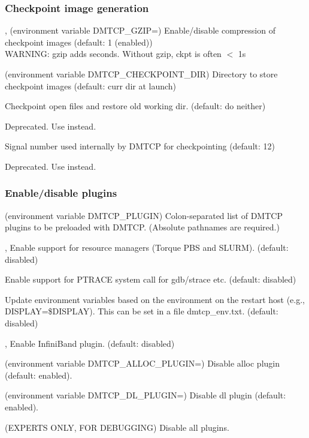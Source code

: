 \subsubsection{Checkpoint image generation}
\begin{Description}
  \item[\Opt{--gzip}, \Opt{--no-gzip} (environment variable DMTCP_GZIP=\Lbr01\Rbr)]
    Enable/disable compression of checkpoint images (default: 1 (enabled))\\
    WARNING:  gzip adds seconds.  Without gzip, ckpt is often $<$ 1s
  \item[\OptSArg{--ckptdir}{path} (environment variable DMTCP_CHECKPOINT_DIR)]
    Directory to store checkpoint images (default: curr dir at launch)
  \item[\Opt{--ckpt-open-files}]
    Checkpoint open files and restore old working dir. (default: do neither)
  \item[\Opt{--checkpoint-open-files}]
    Deprecated. Use  instead.
  \item[\OptSArg{--ckpt-signal}{signum}]
      Signal number used internally by DMTCP for checkpointing (default: 12)
  \item[\OptSArg{--mtcp-checkpoint-signal}{signum}]
    Deprecated. Use  instead.
\end{Description}

\subsubsection{Enable/disable plugins}
\begin{Description}
  \item[\OptSArg{--with-plugin}{plugins} (environment variable DMTCP_PLUGIN)]
    Colon-separated list of DMTCP plugins to be preloaded with DMTCP.
    (Absolute pathnames are required.)
  \item[\Opt{--batch-queue}, \Opt{--rm}]
    Enable support for resource managers (Torque PBS and SLURM).
    (default: disabled)
  \item[\Opt{--ptrace}]
    Enable support for PTRACE system call for gdb/strace etc. (default: disabled)
  \item[\Opt{--modify-env}]
    Update environment variables based on the environment on the restart host
    (e.g., DISPLAY=\$DISPLAY).  This can be set in a file dmtcp_env.txt.
    (default: disabled)
  \item[\Opt{--ib}, \Opt{--infiniband}]
    Enable InfiniBand plugin. (default: disabled)
  \item[\Opt{--disable-alloc-plugin} (environment variable DMTCP_ALLOC_PLUGIN=\Lbr01\Rbr)]
    Disable alloc plugin (default: enabled).
  \item[\Opt{--disable-dl-plugin} (environment variable DMTCP_DL_PLUGIN=\Lbr01\Rbr)]
    Disable dl plugin (default: enabled).
  \item[\Opt{--disable-all-plugins} (EXPERTS ONLY, FOR DEBUGGING)]
    Disable all plugins.
\end{Description}

